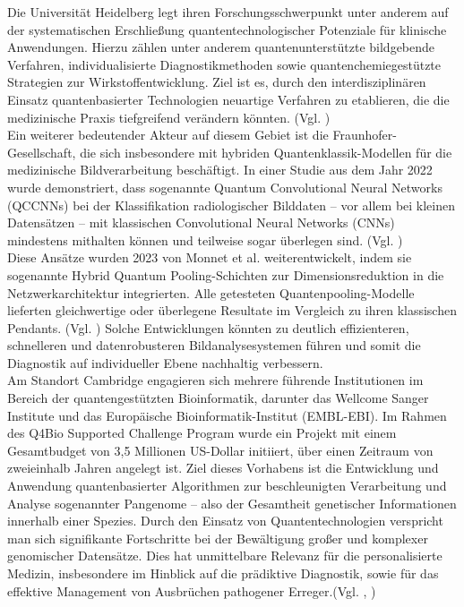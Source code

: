 Die Universität Heidelberg legt ihren Forschungsschwerpunkt unter anderem auf der systematischen Erschließung quantentechnologischer Potenziale für klinische Anwendungen. Hierzu zählen unter anderem quantenunterstützte bildgebende Verfahren, individualisierte Diagnostikmethoden sowie quantenchemiegestützte Strategien zur Wirkstoffentwicklung. Ziel ist es, durch den interdisziplinären Einsatz quantenbasierter Technologien neuartige Verfahren zu etablieren, die die medizinische Praxis tiefgreifend verändern könnten. (Vgl. \cite{noauthor_hgsfp_nodate})\\

Ein weiterer bedeutender Akteur auf diesem Gebiet ist die Fraunhofer-Gesellschaft, die sich insbesondere mit hybriden Quantenklassik-Modellen für die medizinische Bildverarbeitung beschäftigt. In einer Studie aus dem Jahr 2022 wurde demonstriert, dass sogenannte Quantum Convolutional Neural Networks (QCCNNs) bei der Klassifikation radiologischer Bilddaten – vor allem bei kleinen Datensätzen – mit klassischen Convolutional Neural Networks (CNNs) mindestens mithalten können und teilweise sogar überlegen sind. (Vgl. \cite{matic_quantum-classical_2022})\\

Diese Ansätze wurden 2023 von Monnet et al. weiterentwickelt, indem sie sogenannte Hybrid Quantum Pooling-Schichten zur Dimensionsreduktion in die Netzwerkarchitektur integrierten. Alle getesteten Quantenpooling-Modelle lieferten gleichwertige oder überlegene Resultate im Vergleich zu ihren klassischen Pendants. (Vgl. \cite{monnet_pooling_2023}) 
 Solche Entwicklungen könnten zu deutlich effizienteren, schnelleren und datenrobusteren Bildanalysesystemen führen und somit die Diagnostik auf individueller Ebene nachhaltig verbessern.\\

Am Standort Cambridge engagieren sich mehrere führende Institutionen im Bereich der quantengestützten Bioinformatik, darunter das Wellcome Sanger Institute und das Europäische Bioinformatik-Institut (EMBL-EBI). Im Rahmen des Q4Bio Supported Challenge Program wurde ein Projekt mit einem Gesamtbudget von 3,5 Millionen US-Dollar initiiert, über einen Zeitraum von zweieinhalb Jahren angelegt ist. Ziel dieses Vorhabens ist die Entwicklung und Anwendung quantenbasierter Algorithmen zur beschleunigten Verarbeitung und Analyse sogenannter Pangenome – also der Gesamtheit genetischer Informationen innerhalb einer Spezies. Durch den Einsatz von Quantentechnologien verspricht man sich signifikante Fortschritte bei der Bewältigung großer und komplexer genomischer Datensätze. Dies hat unmittelbare Relevanz für die personalisierte Medizin, insbesondere im Hinblick auf die prädiktive Diagnostik, sowie für das effektive Management von Ausbrüchen pathogener Erreger.(Vgl. \cite{apr_2024_researchers_nodate}, \cite{})%

